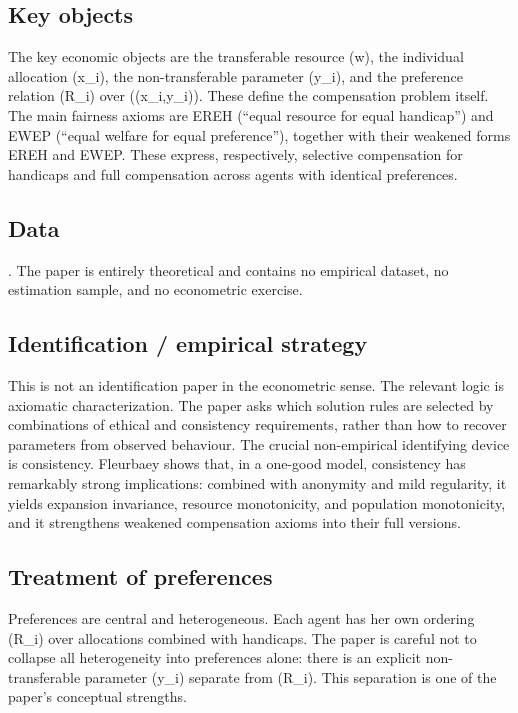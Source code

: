 \documentclass[11pt,a4paper]{article}
\begin{document}
\subsection*{Key objects}
The key economic objects are the transferable resource (w), the individual allocation (x\_i), the non-transferable parameter (y\_i), and the preference relation (R\_i) over ((x\_i,y\_i)). These define the compensation problem itself. The main fairness axioms are EREH (“equal resource for equal handicap”) and EWEP (“equal welfare for equal preference”), together with their weakened forms EREH and EWEP. These express, respectively, selective compensation for handicaps and full compensation across agents with identical preferences.

\subsection*{Data}
. The paper is entirely theoretical and contains no empirical dataset, no estimation sample, and no econometric exercise.

\subsection*{Identification / empirical strategy}
This is not an identification paper in the econometric sense. The relevant logic is axiomatic characterization. The paper asks which solution rules are selected by combinations of ethical and consistency requirements, rather than how to recover parameters from observed behaviour. The crucial non-empirical identifying device is consistency. Fleurbaey shows that, in a one-good model, consistency has remarkably strong implications: combined with anonymity and mild regularity, it yields expansion invariance, resource monotonicity, and population monotonicity, and it strengthens weakened compensation axioms into their full versions.

\subsection*{Treatment of preferences}
Preferences are central and heterogeneous. Each agent has her own ordering (R\_i) over allocations combined with handicaps. The paper is careful not to collapse all heterogeneity into preferences alone: there is an explicit non-transferable parameter (y\_i) separate from (R\_i). This separation is one of the paper’s conceptual strengths.
\end{document}
